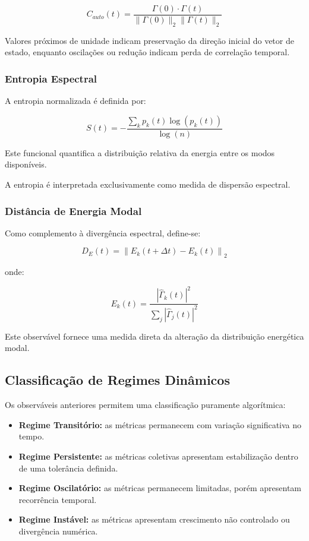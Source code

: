 \documentclass[11pt,a4paper]{article}
\begin{document}
\[
C_{auto}(t)
=
\frac{
\Gamma(0)\cdot\Gamma(t)
}{
\|\Gamma(0)\|_2
\|\Gamma(t)\|_2
}
\]

Valores próximos de unidade indicam preservação da direção inicial
do vetor de estado, enquanto oscilações ou redução indicam perda de
correlação temporal.


\subsubsection{Entropia Espectral}

A entropia normalizada é definida por:

\[
S(t)
=
-\frac{
\sum_k p_k(t)\log(p_k(t))
}{
\log(n)
}
\]

Este funcional quantifica a distribuição relativa da energia entre os
modos disponíveis.

A entropia é interpretada exclusivamente como medida de dispersão
espectral.


\subsubsection{Distância de Energia Modal}

Como complemento à divergência espectral, define-se:

\[
D_E(t)
=
\left\|
E_k(t+\Delta t)
-
E_k(t)
\right\|_2
\]

onde:

\[
E_k(t)
=
\frac{
|\hat{\Gamma}_k(t)|^2
}{
\sum_j |\hat{\Gamma}_j(t)|^2
}
\]

Este observável fornece uma medida direta da alteração da distribuição
energética modal.


\subsection{Classificação de Regimes Dinâmicos}

Os observáveis anteriores permitem uma classificação puramente
algorítmica:

\begin{itemize}

\item \textbf{Regime Transitório:}
as métricas permanecem com variação significativa no tempo.

\item \textbf{Regime Persistente:}
as métricas coletivas apresentam estabilização dentro de uma tolerância
definida.

\item \textbf{Regime Oscilatório:}
as métricas permanecem limitadas, porém apresentam recorrência temporal.

\item \textbf{Regime Instável:}
as métricas apresentam crescimento não controlado ou divergência
numérica.

\end{itemize}
\end{document}
